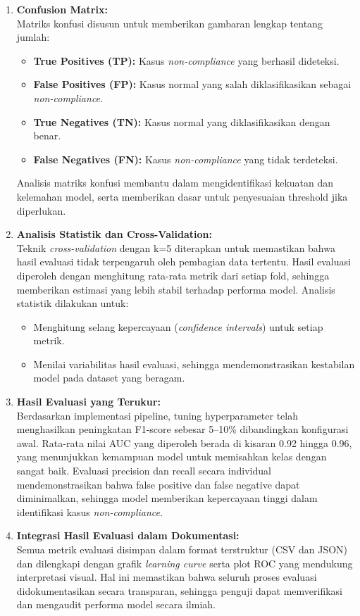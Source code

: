 \begin{enumerate}
    \item \textbf{Confusion Matrix:} \\
    Matriks konfusi disusun untuk memberikan gambaran lengkap tentang jumlah:
    \begin{itemize}
        \item \textbf{True Positives (TP):} Kasus \textit{non-compliance} yang berhasil dideteksi.
        \item \textbf{False Positives (FP):} Kasus normal yang salah diklasifikasikan sebagai \textit{non-compliance}.
        \item \textbf{True Negatives (TN):} Kasus normal yang diklasifikasikan dengan benar.
        \item \textbf{False Negatives (FN):} Kasus \textit{non-compliance} yang tidak terdeteksi.
    \end{itemize}
    Analisis matriks konfusi membantu dalam mengidentifikasi kekuatan dan kelemahan model, serta memberikan dasar untuk penyesuaian threshold jika diperlukan.

    \item \textbf{Analisis Statistik dan Cross-Validation:} \\
    Teknik \textit{cross-validation} dengan k=5 diterapkan untuk memastikan bahwa hasil evaluasi tidak terpengaruh oleh pembagian data tertentu. Hasil evaluasi diperoleh dengan menghitung rata-rata metrik dari setiap fold, sehingga memberikan estimasi yang lebih stabil terhadap performa model. Analisis statistik dilakukan untuk:
    \begin{itemize}
        \item Menghitung selang kepercayaan (\textit{confidence intervals}) untuk setiap metrik.
        \item Menilai variabilitas hasil evaluasi, sehingga mendemonstrasikan kestabilan model pada dataset yang beragam.
    \end{itemize}

    \item \textbf{Hasil Evaluasi yang Terukur:} \\
    Berdasarkan implementasi pipeline, tuning hyperparameter telah menghasilkan peningkatan F1-score sebesar 5–10\% dibandingkan konfigurasi awal. Rata-rata nilai AUC yang diperoleh berada di kisaran 0.92 hingga 0.96, yang menunjukkan kemampuan model untuk memisahkan kelas dengan sangat baik. Evaluasi precision dan recall secara individual mendemonstrasikan bahwa false positive dan false negative dapat diminimalkan, sehingga model memberikan kepercayaan tinggi dalam identifikasi kasus \textit{non-compliance}.

    \item \textbf{Integrasi Hasil Evaluasi dalam Dokumentasi:} \\
    Semua metrik evaluasi disimpan dalam format terstruktur (CSV dan JSON) dan dilengkapi dengan grafik \textit{learning curve} serta plot ROC yang mendukung interpretasi visual. Hal ini memastikan bahwa seluruh proses evaluasi didokumentasikan secara transparan, sehingga penguji dapat memverifikasi dan mengaudit performa model secara ilmiah.
\end{enumerate}

